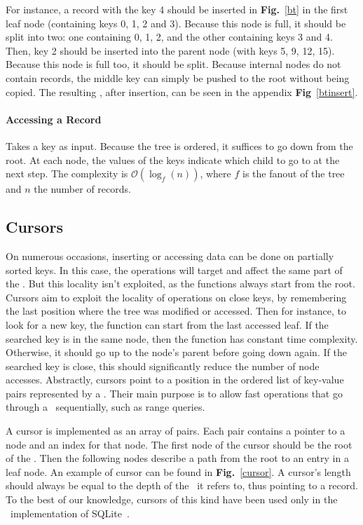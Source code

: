 For instance, a record with the key 4 should be inserted in \textbf{Fig.}~\ref{bt} in the first leaf node (containing keys 0, 1, 2 and 3).
Because this node is full, it should be split into two: one containing 0, 1, 2, and the other containing keys 3 and 4.
Then, key 2 should be inserted into the parent node (with keys 5, 9, 12, 15).
Because this node is full too, it should be split.
Because internal nodes do not contain records, the middle key can simply be pushed to the root without being copied.
The resulting \btree, after insertion, can be seen in the appendix \textbf{Fig}~\ref{btinsert}.

\beforeinsert

\paragraph{Accessing a Record} Takes a key as input. Because the tree is ordered, it suffices to go down from the root.
At each node, the values of the keys indicate which child to go to at the next step.
The complexity is $\mathcal{O}(\log_{f}(n))$, where $f$ is the fanout of the tree and $n$ the number of records.

\subsection{Cursors}
On numerous occasions, inserting or accessing data can be done on partially sorted keys.
In this case, the operations will target and affect the same part of the \btree.
But this locality isn't exploited, as the functions always start from the root.
Cursors aim to exploit the locality of operations on close keys, by remembering the last position where the tree was modified or accessed.
Then for instance, to look for a new key, the function can start from the last accessed leaf. If the searched key is in the same node, then the function has constant time complexity.
Otherwise, it should go up to the node's parent before going down again. If the searched key is close, this should significantly reduce the number of node accesses.
Abstractly, cursors point to a position in the ordered list of key-value pairs represented by a \btree.
Their main purpose is to allow fast operations that go through a \btree\ sequentially, such as range queries.

A cursor is implemented as an array of pairs. Each pair contains a pointer to a node and an index for that node.
The first node of the cursor should be the root of the \btree.
Then the following nodes describe a path from the root to an entry in a leaf node.
An example of cursor can be found in \textbf{Fig.}~\ref{cursor}.
A cursor's length should always be equal to the depth of the \btree\ it refers to, thus pointing to a record.
To the best of our knowledge, cursors of this kind have been used only in the \btrees\ implementation of SQLite~\cite{sqlite}.

